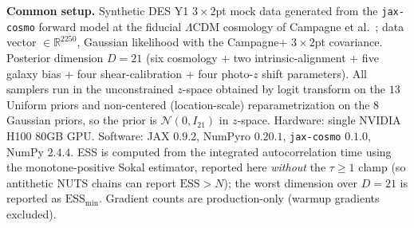 \documentclass{article}
\begin{document}
\textbf{Common setup.}  Synthetic DES Y1 $3\times 2$pt mock data
generated from the \texttt{jax-cosmo} forward model at the fiducial
$\Lambda$CDM cosmology of Campagne et al.\ \cite{campagne2023jax}; data
vector $\in \mathbb{R}^{2250}$, Gaussian likelihood with the Campagne+
$3\times 2$pt covariance.  Posterior dimension $D=21$ (six cosmology +
two intrinsic-alignment + five galaxy bias + four shear-calibration +
four photo-$z$ shift parameters).  All samplers run in the unconstrained
$z$-space obtained by logit transform on the $13$ Uniform priors and
non-centered (location-scale) reparametrization on the $8$ Gaussian
priors, so the prior is $\mathcal{N}(0, I_{21})$ in $z$-space.
Hardware: single NVIDIA H100 80GB GPU.  Software:
JAX $0.9.2$, NumPyro $0.20.1$, \texttt{jax-cosmo} $0.1.0$, NumPy
$2.4.4$.  ESS is computed from the integrated autocorrelation time using
the monotone-positive Sokal estimator, reported here \emph{without} the
$\tau \ge 1$ clamp (so antithetic NUTS chains can report $\text{ESS} > N$);
the worst dimension over $D=21$ is reported as $\text{ESS}_{\min}$.
Gradient counts are production-only (warmup gradients excluded).
\end{document}
